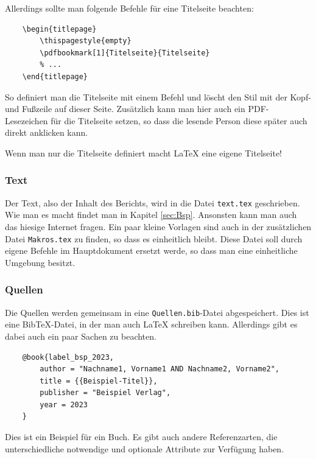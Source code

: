 Allerdings sollte man folgende Befehle für eine Titelseite beachten:

\begin{verbatim}
    \begin{titlepage}
        \thispagestyle{empty}
        \pdfbookmark[1]{Titelseite}{Titelseite}
        % ...
    \end{titlepage}
\end{verbatim}

So definiert man die Titelseite mit einem Befehl und löscht den Stil mit der Kopf- und Fußzeile auf dieser Seite. Zusätzlich kann man hier auch ein PDF-Lesezeichen für die Titelseite setzen, so dass die lesende Person diese später auch direkt anklicken kann.

\textcolor{red1}{Wenn man nur die Titelseite definiert macht \LaTeX{} eine eigene Titelseite!}


\subsubsection{Text}

Der Text, also der Inhalt des Berichts, wird in die Datei \verb|text.tex| geschrieben. Wie man es macht findet man in Kapitel \ref{sec:Bsp}. Ansonsten kann man auch das hiesige Internet fragen. Ein paar kleine Vorlagen sind auch in der zusätzlichen Datei \verb|Makros.tex| zu finden, so dass es einheitlich bleibt. \textcolor{red1}{Diese Datei soll durch eigene Befehle im Hauptdokument ersetzt werde, so dass man eine einheitliche Umgebung besitzt.}


\subsubsection{Quellen}

Die Quellen werden gemeinsam in eine \verb|Quellen.bib|-Datei abgespeichert. Dies ist eine BibTeX-Datei, in der man auch \LaTeX{} schreiben kann. Allerdings gibt es dabei auch ein paar Sachen zu beachten.

\begin{verbatim}
    @book{label_bsp_2023,
        author = "Nachname1, Vorname1 AND Nachname2, Vorname2",
        title = {{Beispiel-Titel}},
        publisher = "Beispiel Verlag",
        year = 2023
    }
\end{verbatim}

Dies ist ein Beispiel für ein Buch. Es gibt auch andere Referenzarten, die unterschiedliche notwendige und optionale Attribute zur Verfügung haben.\\

